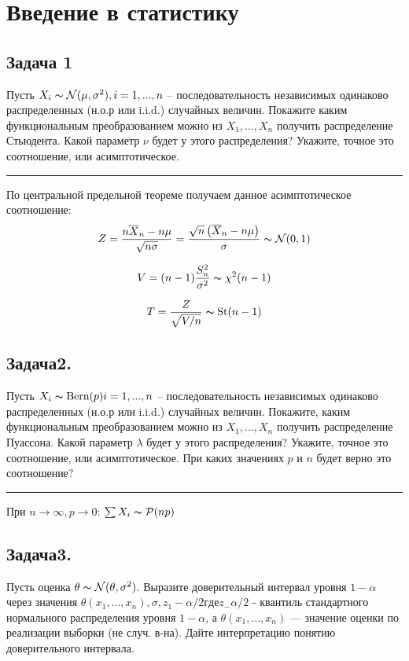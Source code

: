 \documentclass[8pt,reqno]{article}
\theoremstyle{definition}
\theoremstyle{remark}
\begin{document}
\section*{Введение в статистику}

\subsection*{Задача 1}

Пусть $X_i \thicksim \mathcal{N}(\mu, \sigma^2),i = 1,...,n$ – последовательность независимых одинаково распределенных (н.о.р или i.i.d.) случайных величин. Покажите каким функциональным преобразованием можно из $X_1,...,X_n$ получить распределение Стьюдента. Какой параметр $\nu$ будет у этого распределения? Укажите, точное это соотношение, или асимптотическое.

\noindent\rule{8cm}{0.4pt}


По центральной предельной теореме получаем данное асимптотическое соотношение:
$$
Z = \frac{n\overline{X}_n - n\mu}{\sqrt{n\sigma}} = \frac{\sqrt{n}\left(\overline{X}_n - n\mu\right)}{\sigma} \thicksim \mathcal{N}(0, 1)
$$

$$
V = (n - 1) \frac{S_n^2}{\sigma^2} \thicksim \chi^2(n-1)
$$

$$
T = \frac{Z}{\sqrt{V/n}} \thicksim \mbox{St}(n-1)
$$

\subsection*{Задача2.}

Пусть $X_i \thicksim \mbox{Bern}(p) i = 1,...,n$ – последовательность независимых одинаково распределенных (н.о.р или i.i.d.) случайных величин. Покажите, каким функциональным преобразованием можно из $X_1,...,X_n$ получить распределение Пуассона. Какой параметр $\lambda$ будет у этого распределения? Укажите, точное это соотношение, или асимптотическое. При каких значениях $p$ и $n$ будет верно это соотношение?

\noindent\rule{8cm}{0.4pt}

При $n \rightarrow \infty, p \rightarrow 0$: $\sum X_i \thicksim \mathcal{P}(np)$

\subsection*{Задача3.}

Пусть оценка $\theta \thicksim \mathcal{N}(\theta, \sigma^2)$. Выразите доверительный интервал уровня $1-\alpha$ через значения $\theta(x_1,...,x_n), \sigma, z_1-\alpha/2 где z_-\alpha/2$ - квантиль стандартного нормального распределения уровня $1-\alpha$, а $\theta(x_1,...,x_n)$ — значение оценки по реализации выборки (не случ. в-на). Дайте интерпретацию понятию доверительного интервала.
\end{document}
